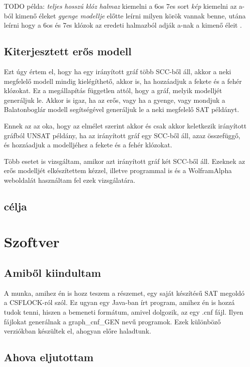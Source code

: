 \documentclass[
]{thesis-ekf}
\theoremstyle{definition}
\theoremstyle{remark}
\begin{document}
	TODO példa: \textit{teljes hosszú klóz halmaz} kiemelni a 6os 7es sort \textit{kép} kiemelni az a-ból kimenő éleket \textit{gyenge modellje} előtte leírni milyen körök vannak benne, utána leírni hogy a 6os és 7es klózok az eredeti halmazból adják a-nak a kimenő éleit \cite[a 24.~oldalon]{sat-solving-50}.

	\section{Kiterjesztett erős modell}\label{esm}
	Ezt úgy értem el, hogy ha egy irányított gráf több SCC-ből áll, akkor a neki megfelelő modell mindig kielégíthető, akkor is, ha hozzáadjuk a fekete és a fehér klózokat. Ez a megállapítás független attól, hogy a gráf, melyik modelljét generáljuk le. Akkor is igaz, ha az erős, vagy ha a gyenge, vagy mondjuk a Balatonboglár modell segítségével generáljuk le a neki megfelelő SAT példányt.
	
	Ennek az az oka, hogy az elmélet szerint akkor és csak akkor keletkezik irányított gráfból UNSAT példány, ha az irányított gráf egy SCC-ből áll, azaz összefüggő, és hozzáadjuk a modelljéhez a fekete és a fehér klózokat.
	
	Több esetet is vizsgáltam, amikor azt irányított gráf két SCC-ből áll. Ezeknek az erős modelljét elkészítettem kézzel, illetve programmal is és a WolframAlpha weboldalát használtam fel ezek vizsgálatára.
	
	
	
	\section{célja}
	
	\chapter{Szoftver}
	\section{Amiből kiindultam}
	A munka, amihez én is hozz teszem a részemet, egy saját készítésű SAT megoldó a CSFLOCK-ról szól. Ez ugyan egy Java-ban írt program, amihez én is hozzá tudok tenni, hiszen a bemeneti formátum, amivel dolgozik, az egy .cnf fájl. Ilyen fájlokat generálnak a graph\_cnf\_GEN nevű programok. Ezek különböző verziókban készültek el, ahogyan előre haladtunk.
	
	\section{Ahova eljutottam}
	
\end{document}
